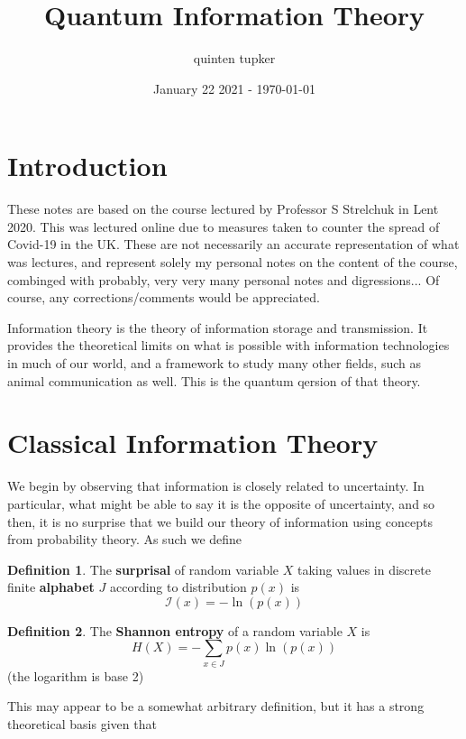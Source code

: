 \documentclass{article}
\title{Quantum Information Theory}
\author{quinten tupker}
\date{January 22 2021 - \today}
\theoremstyle{definition}
\newtheorem{definition}{Definition}
\begin{document}
\maketitle

\section*{Introduction}

These notes are based on the course lectured by Professor S Strelchuk in Lent 2020.
This was lectured online due to measures taken to counter the spread of Covid-19
in the UK. These are not necessarily an accurate representation of what was
lectures, and represent solely my personal notes on the content of the course,
combinged with probably, very very many personal notes and digressions... Of
course, any corrections/comments would be appreciated.

Information theory is the theory of information storage and transmission. It
provides the theoretical limits on what is possible with information
technologies in much of our world, and a framework to study many other fields,
such as animal communication as well. This is the quantum qersion of that
theory.

\section{Classical Information Theory}

We begin by observing that information is closely related to uncertainty. In
particular, what might be able to say it is the opposite of uncertainty, and so
then, it is no surprise that we build our theory of information using concepts
from probability theory. As such we define

\begin{definition}
  The \textbf{surprisal} of random variable $X$ taking values in discrete finite
  \textbf{alphabet} $J$ according to distribution $p(x)$ is
  $$ \mathcal{I}(x) = - \ln(p(x)) $$
\end{definition}

\begin{definition}
  The \textbf{Shannon entropy} of a random variable $X$ is
  $$ H(X) = -\sum_{x \in J} p(x) \ln(p(x)) $$
  (the logarithm is base 2)
\end{definition}

This may appear to be a somewhat arbitrary definition, but it has a strong
theoretical basis given that
\end{document}
